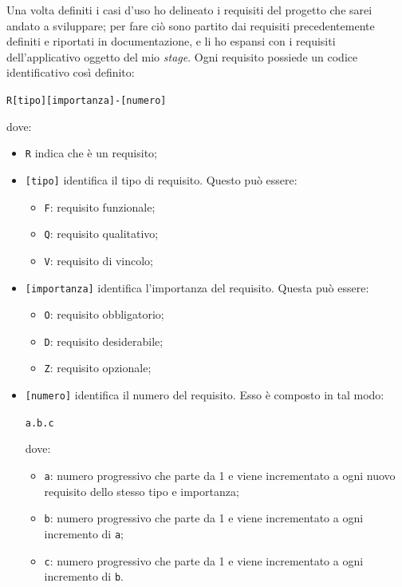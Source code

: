 Una volta definiti i casi d'uso ho delineato i requisiti del progetto che sarei andato a sviluppare; per fare ciò sono partito dai requisiti precedentemente definiti e riportati in documentazione, e li ho espansi con i requisiti dell'applicativo oggetto del mio \textit{stage}. Ogni requisito possiede un codice identificativo così definito:
\begin{center}
  \centering
  \texttt{R[tipo][importanza]-[numero]}
\end{center} dove:
\begin{itemize}
  \item \texttt{R} indica che è un requisito;
  \item \texttt{[tipo]} identifica il tipo di requisito. Questo può essere:
  \begin{itemize}
    \item \texttt{F}: requisito funzionale;
    \item \texttt{Q}: requisito qualitativo;
    \item \texttt{V}: requisito di vincolo;
  \end{itemize}
  \item \texttt{[importanza]} identifica l'importanza del requisito. Questa può essere:
  \begin{itemize}
    \item \texttt{O}: requisito obbligatorio;
    \item \texttt{D}: requisito desiderabile;
    \item \texttt{Z}: requisito opzionale;
  \end{itemize}
  \item \texttt{[numero]} identifica il numero del requisito. Esso è composto in tal modo:
  \begin{center}
    \centering
    \texttt{a.b.c}
  \end{center} dove:
  \begin{itemize}
    \item \texttt{a}: numero progressivo che parte da 1 e viene incrementato a ogni nuovo requisito dello stesso tipo e importanza;
    \item \texttt{b}: numero progressivo che parte da 1 e viene incrementato a ogni incremento di \texttt{a};
    \item \texttt{c}: numero progressivo che parte da 1 e viene incrementato a ogni incremento di \texttt{b}.
  \end{itemize}
\end{itemize}


